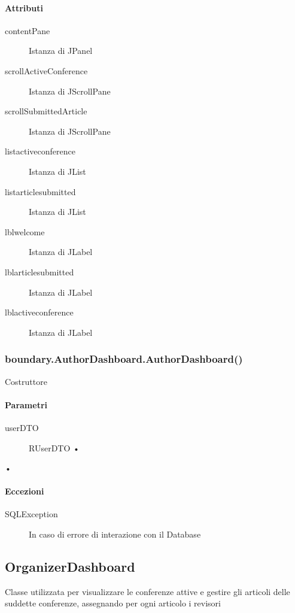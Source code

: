 \paragraph{Attributi}
\begin{description}
\item[contentPane] Istanza di JPanel 
\item[scrollActiveConference] Istanza di JScrollPane
\item[scrollSubmittedArticle] Istanza di JScrollPane
\item[listactiveconference] Istanza di JList
\item[listarticlesubmitted] Istanza di JList
\item[lblwelcome] Istanza di JLabel
\item[lblarticlesubmitted] Istanza di JLabel
\item[lblactiveconference] Istanza di JLabel
\end{description}

\subsubsection{boundary.AuthorDashboard.AuthorDashboard()}
Costruttore
\paragraph{Parametri}
\begin{description}
\item[userDTO] RUserDTO
•
\end{description}•
\paragraph{Eccezioni}
\begin{description}
\item[SQLException] In caso di errore di interazione con il Database
\end{description}

\subsection{OrganizerDashboard}
Classe utilizzata per visualizzare le conferenze attive e gestire gli articoli delle suddette conferenze, assegnando per ogni articolo i revisori
